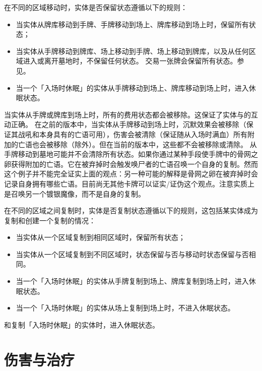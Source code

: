 在不同的区域移动时，实体是否保留状态遵循以下的规则：
\begin{itemize}
    \item 当实体从牌库移动到手牌、手牌移动到场上、牌库移动到场上时，保留所有状态；
    \item 当实体从手牌移动到牌库、场上移动到手牌、场上移动到牌库，以及从任何区域进入或离开墓地时，不保留任何状态。
        \exception 交易一张牌会保留所有状态。参见。
    \item 当一个「入场时休眠」的实体从手牌移动到场上、牌库移动到场上时，进入休眠状态。
\end{itemize}

\notice 当实体从手牌或牌库到场上时，所有的费用状态都会被移除。这保证了实体与的互动正确。
\notice {}在之前的版本中，当实体从手牌移动到场上时，沉默效果会被移除（保证其战吼和本身具有的亡语可用），伤害会被清除（保证随从入场时满血）所有附加的亡语也会被移除（除外）。但在当前的版本中，这些都不会被移除或清除。
\exception 从手牌移动到墓地可能并不会清除所有状态。如果你通过某种手段使手牌中的骨网之卵获得附加的亡语。它在被弃掉时会触发唤尸者的亡语召唤一个自身的复制。然而这个例子并不能完全证实上面的观点：另一种可能的解释是骨网之卵在被弃掉时会记录自身拥有哪些亡语。目前尚无其他卡牌可以证实/证伪这个观点。注意实质上是召唤另一个镀银魔像，而不是自身的复制。

在不同的区域之间复制时，实体是否复制状态遵循以下的规则，这包括某实体成为复制和创建一个复制的情况：
\begin{itemize}
    \item 当实体从一个区域复制到相同区域时，保留所有状态；
    \item 当实体从一个区域复制到不同区域时，状态保留与否与移动时状态保留与否相同。
    \item 当一个「入场时休眠」的实体从手牌复制到场上、牌库复制到场上时，进入休眠状态。
    \item 当一个「入场时休眠」的实体从场上复制到场上时，不进入休眠状态。
\end{itemize}
\exception {}和复制「入场时休眠」的实体时，进入休眠状态。

\section{伤害与治疗}
\label{damage-healing}

